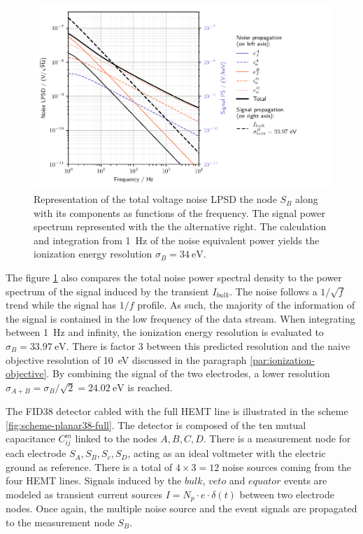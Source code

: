 \begin{figure}
\centering
\includegraphics[scale=1]{Figures/Electrodes/pl38_noise_propagation.pdf}
\caption{Representation of the total voltage noise LPSD the node $S_B$ along with its components as functions of the frequency. The signal power spectrum represented with the the alternative right. The calculation and integration from \SI{1}{\Hz} of the noise equivalent power yields the ionization energy resolution $\sigma_{B} = \SI{34}{\eV}$.}
\label{fig:planar38-propagation}
\end{figure}

The figure \ref{fig:planar38-propagation} also compares the total noise power spectral density to the power spectrum of the signal induced by the transient $I_{bulk}$. The noise follows a $1/\sqrt{f}$ trend while the signal has $1/f$ profile. As such, the majority of the information of the signal is contained in the low frequency of the data stream. When integrating between \SI{1}{\Hz} and infinity, the ionization energy resolution is evaluated to $\sigma_B=\SI{33.97}{\eV}$. There is factor 3 between this predicted resolution and the naive objective resolution of \SI{10}{\eV} discussed in the paragraph \ref{par:ionization-objective}. By combining the signal of the two electrodes, a lower resolution $\sigma_{A+B} = \sigma_B / \sqrt{2} = \SI{24.02}{\eV}$ is reached. 


The FID38 detector cabled with the full HEMT line is illustrated in the scheme \ref{fig:scheme-planar38-full}. The detector is composed of the ten mutual capacitance $C_{ij}^m$ linked to the nodes $A,B,C,D$. There is a measurement node for each electrode $S_A, S_B, S_c, S_D$, acting as an ideal voltmeter with the electric ground as reference. There is a total of $4\times3=12$ noise sources coming from the four HEMT lines. Signals induced by the $bulk$, $veto$ and $equator$ events are modeled as transient current sources $I=N_p \cdot e \cdot \delta(t)$ between two electrode nodes. Once again, the multiple noise source and the event signals are propagated to the measurement node $S_B$.

